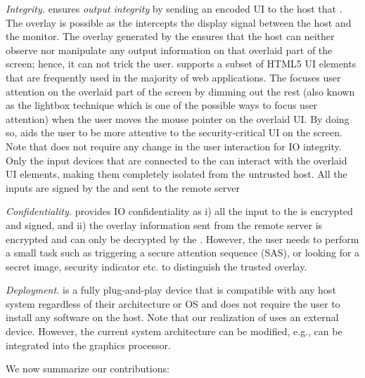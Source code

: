 \emph{Integrity.} \name ensures \emph{output integrity} by sending an encoded UI to the host that . The overlay is possible as the \device intercepts the display signal between the host and the monitor. The overlay generated by the \device ensures that the host can neither observe nor manipulate any output information on that overlaid part of the screen; hence, it can not trick the user. \device supports a subset of HTML5 UI elements that are frequently used in the majority of web applications. The \device focuses user attention on the overlaid part of the screen by dimming out the rest (also known as the lightbox technique which is one of the possible ways to focus user attention) when the user moves the mouse pointer on the overlaid UI. By doing so, \name aids the user to be more attentive to the security-critical UI on the screen. Note that \name does not require any change in the user interaction for IO integrity. Only the input devices that are connected to the \device can interact with the overlaid UI elements, making them completely isolated from the untrusted host. All the inputs are signed by the \device and sent to the remote server

\emph{Confidentiality.} \name provides IO confidentiality as i) all the input to the \device is encrypted and signed, and ii) the overlay information sent from the remote server is encrypted and can only be decrypted by the \device. However, the user needs to perform a small task such as triggering a secure attention sequence (SAS), or looking for a secret image, security indicator etc. to distinguish the trusted overlay.


\emph{Deployment.} \device is a fully plug-and-play device that is compatible with any host system regardless of their architecture or OS and does not require the user to install any software on the host. Note that our realization of \name uses an external device. However, the current system architecture can be modified, e.g., \device can be integrated into the graphics processor. 

 We now summarize our contributions:


